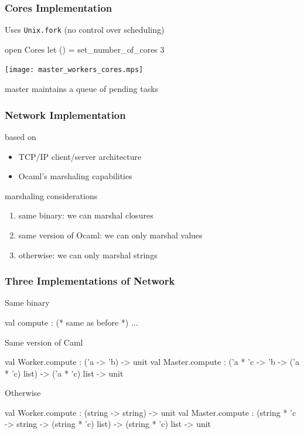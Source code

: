 \documentclass[xcolor=dvipsnames]{beamer}
\let\emph\alert
\begin{document}


\begin{frame}\frametitle {Cores Implementation}
  Uses \texttt{Unix.fork} (no control over scheduling)

  \begin{ocaml}
  open Cores
  let () = set_number_of_cores 3
  \end{ocaml}

  \begin{center}
    \texttt{[image: master\_workers\_cores.mps]}
  \end{center}

  master maintains a queue of pending tasks
  
\end{frame}



\begin{frame}\frametitle {Network Implementation}
  based on
  \begin{itemize}
  \item TCP/IP client/server architecture
  \item Ocaml's marshaling capabilities
  \end{itemize}
  
  \vfill
  marshaling considerations
  \begin{enumerate}
  \item \emph{same binary}: we can marshal closures
  \item \emph{same version of Ocaml}: we can only marshal values
  \item \emph{otherwise}: we can only marshal strings
  \end{enumerate}
  
\end{frame}


\begin{frame}\frametitle {Three Implementations of Network}
  
\emph{Same binary}
\begin{ocaml}
val compute : (* same as before *) ...
\end{ocaml}



\emph{Same version of Caml}
    \begin{ocaml}
val Worker.compute : ('a -> 'b) -> unit
val Master.compute : 
  ('a * 'c -> 'b -> ('a * 'c) list) ->
  ('a * 'c) list -> unit
\end{ocaml}



\emph{Otherwise}
    \begin{ocaml}
val Worker.compute : (string -> string) -> unit
val Master.compute : 
  (string * 'c -> string -> (string * 'c) list) ->
  (string * 'c) list -> unit
\end{ocaml}

\end{frame}
\end{document}
